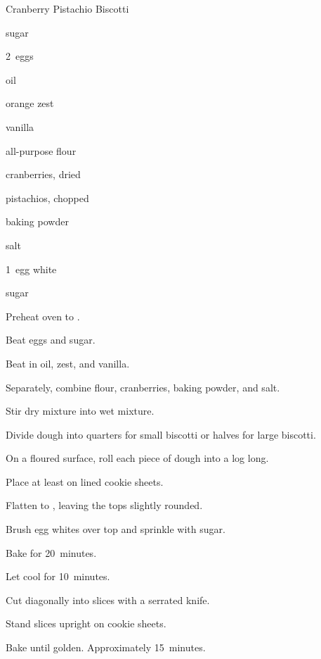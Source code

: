 \begin{recipe}{Cranberry Pistachio Biscotti}{}{}

\begin{ingredients}
\item \C{\threequarter} sugar
\item 2~eggs
\item \C{\quarter} oil
\item \tp{1\half} orange zest
\item \tp{1\half} vanilla
\item {} all-purpose flour
\item \C{\half} cranberries, dried
\item \C{\half} pistachios, chopped
\item {} baking powder
\item \tp{\quarter} salt
\item 1~egg white
\item {} sugar
\end{ingredients}

\begin{directions}
\item Preheat oven to .
\item Beat eggs and \C{\threequarter} sugar.
\item Beat in oil, zest, and vanilla.
\item Separately, combine flour, cranberries, baking powder, and salt.
\item Stir dry mixture into wet mixture.
\item Divide dough into quarters for small biscotti or halves for large biscotti.
\item On a floured surface, roll each piece of dough into a log  long. 
\item Place at least  on lined cookie sheets.
\item Flatten to \inch{\threequarter}, leaving the tops slightly rounded.
\item Brush egg whites over top and sprinkle with sugar.
\item Bake for 20~minutes.
\item Let cool for 10~minutes.
\item Cut diagonally into \inch{\half} slices with a serrated knife.
\item Stand slices upright on cookie sheets.
\item Bake until golden. Approximately 15~minutes.
\end{directions}

\end{recipe}
